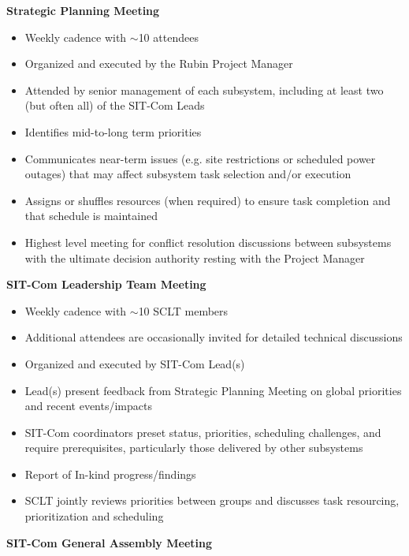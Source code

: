 \documentclass[SE,lsstdraft,authoryear,toc]{lsstdoc}
\begin{document}
\textbf{Strategic Planning Meeting}

\begin{itemize}
    \item Weekly cadence with $\sim$10 attendees
    \item Organized and executed by the Rubin Project Manager
    \item Attended by senior management of each subsystem, including at least two (but often all) of the SIT-Com Leads
    \item Identifies mid-to-long term priorities
    \item Communicates near-term issues (e.g. site restrictions or scheduled power outages) that may affect subsystem task selection and/or execution
    \item Assigns or shuffles resources (when required) to ensure task completion and that schedule is maintained
    \item Highest level meeting for conflict resolution discussions between subsystems with the ultimate decision authority resting with the Project Manager
\end{itemize}

\textbf{SIT-Com Leadership Team Meeting}

\begin{itemize}
    \item Weekly cadence with $\sim$10 SCLT members
    \item Additional attendees are occasionally invited for detailed technical discussions
    \item Organized and executed by SIT-Com Lead(s)
    \item Lead(s) present feedback from Strategic Planning Meeting on global priorities and recent events/impacts
    \item SIT-Com coordinators preset status, priorities, scheduling challenges, and require prerequisites, particularly those delivered by other subsystems
    \item Report of In-kind progress/findings
    \item SCLT jointly reviews priorities between groups and discusses task resourcing, prioritization and scheduling
\end{itemize}


\textbf{SIT-Com General Assembly Meeting}
\end{document}
